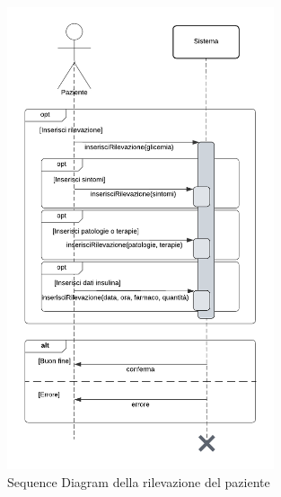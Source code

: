 \documentclass[a4paper]{article}
\begin{document}
\begin{figure}[H]
	\centering
	\includegraphics[width=0.7\textwidth]{sdPaziente}
	\caption{Sequence Diagram della rilevazione del paziente}
	\label{fig:usecase}
\end{figure}
\end{document}
